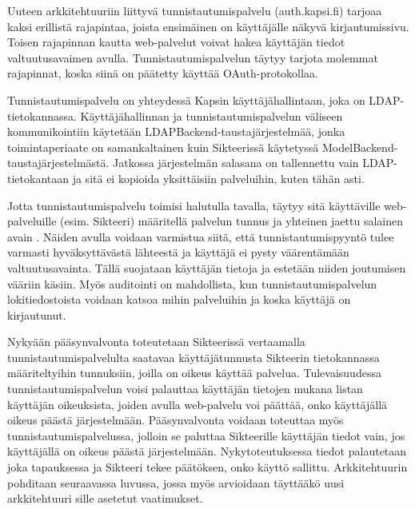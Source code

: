 Uuteen arkkitehtuuriin liittyvä tunnistautumispalvelu (auth.kapsi.fi) tarjoaa kaksi erillistä rajapintaa, joista ensimäinen on käyttäjälle näkyvä kirjautumissivu. Toisen rajapinnan kautta web-palvelut voivat hakea käyttäjän tiedot valtuutusavaimen avulla. Tunnistautumispalvelun täytyy tarjota molemmat rajapinnat, koska siinä on päätetty käyttää OAuth-protokollaa.

Tunnistautumispalvelu on yhteydessä Kapsin käyttäjähallintaan, joka on LDAP-tietokannassa. Käyttäjähallinnan ja tunnistautumispalvelun väliseen kommunikointiin käytetään LDAPBack\-end-taustajärjestelmää, jonka toimintaperiaate on samankaltainen kuin Sikteerissä käytetyssä ModelBackend-taustajärjestelmästä. Jatkossa järjestelmän salasana on tallennettu vain LDAP-tietokantaan ja sitä ei kopioida yksittäisiin palveluihin, kuten tähän asti.

Jotta tunnistautumispalvelu toimisi halutulla tavalla, täytyy sitä käyttäville web-palveluille (esim. Sikteeri) määritellä palvelun tunnus ja yhteinen jaettu salainen avain \cite{oauth2_0}. Näiden avulla voidaan varmistua siitä, että tunnistautumispyyntö tulee varmasti hyväksyttävästä lähteestä ja käyttäjä ei pysty väärentämään valtuutusavainta. Tällä suojataan käyttäjän tietoja ja estetään niiden joutumisen vääriin käsiin. Myös auditointi on mahdollista, kun tunnistautumispalvelun lokitiedostoista voidaan katsoa mihin palveluihin ja koska käyttäjä on kirjautunut.

Nykyään pääsynvalvonta toteutetaan Sikteerissä vertaamalla tunnistautumispalvelulta saatavaa käyttäjätunnusta Sikteerin tietokannassa määriteltyihin tunnuksiin, joilla on oikeus käyttää palvelua. Tulevaisuudessa tunnistautumispalvelun voisi palauttaa käyttäjän tietojen mukana listan käyttäjän oikeuksista, joiden avulla web-palvelu voi päättää, onko käyttäjällä oikeus päästä järjestelmään. Pääsynvalvonta voidaan toteuttaa myös tunnistautumispalvelussa, jolloin se paluttaa Sikteerille käyttäjän tiedot vain, jos käyttäjällä on oikeus päästä järjestelmään. Nykytoteutuksessa tiedot palautetaan joka tapauksessa ja Sikteeri tekee päätöksen, onko käyttö sallittu. Arkkitehtuurin pohditaan seuraavassa luvussa, jossa myös arvioidaan täyttääkö uusi arkkitehtuuri sille asetetut vaatimukset.